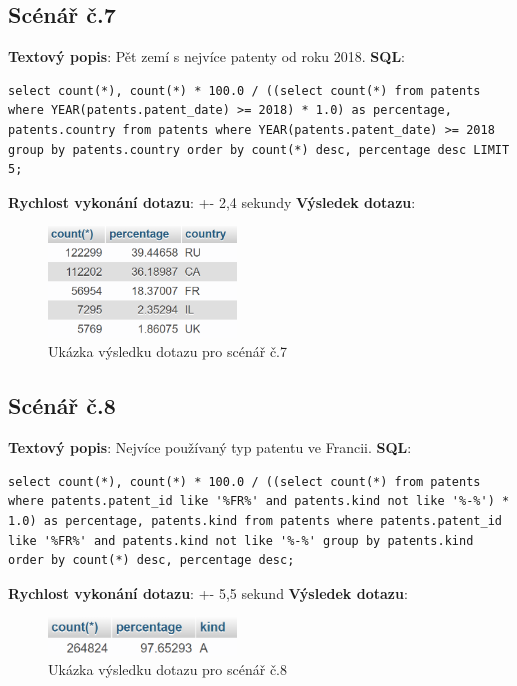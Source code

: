 \subsection{Scénář č.7}
\textbf{Textový popis}: Pět zemí s nejvíce patenty od roku 2018.
\newline
\textbf{SQL}: 
\begin{lstlisting}[label = {lst:elements_a}]
select count(*), count(*) * 100.0 / ((select count(*) from patents where YEAR(patents.patent_date) >= 2018) * 1.0) as percentage, patents.country from patents where YEAR(patents.patent_date) >= 2018 group by patents.country order by count(*) desc, percentage desc LIMIT 5;
\end{lstlisting}
\textbf{Rychlost vykonání dotazu}: +- 2,4 sekundy
\newline
\textbf{Výsledek dotazu}:
\begin{figure}[H]
\centering
\includegraphics[width=5cm]{img/scenare/scenar_7}
\caption{Ukázka výsledku dotazu pro scénář č.7}
\label{fig:scenar7}
\end{figure}

\subsection{Scénář č.8}
\textbf{Textový popis}: Nejvíce používaný typ patentu ve Francii.
\newline
\textbf{SQL}: 
\begin{lstlisting}[label = {lst:elements_a}]
select count(*), count(*) * 100.0 / ((select count(*) from patents where patents.patent_id like '%FR%' and patents.kind not like '%-%') * 1.0) as percentage, patents.kind from patents where patents.patent_id like '%FR%' and patents.kind not like '%-%' group by patents.kind order by count(*) desc, percentage desc;
\end{lstlisting}
\textbf{Rychlost vykonání dotazu}: +- 5,5 sekund
\newline
\textbf{Výsledek dotazu}:
\begin{figure}[H]
\centering
\includegraphics[width=5cm]{img/scenare/scenar_8}
\caption{Ukázka výsledku dotazu pro scénář č.8}
\label{fig:scenar8}
\end{figure}

